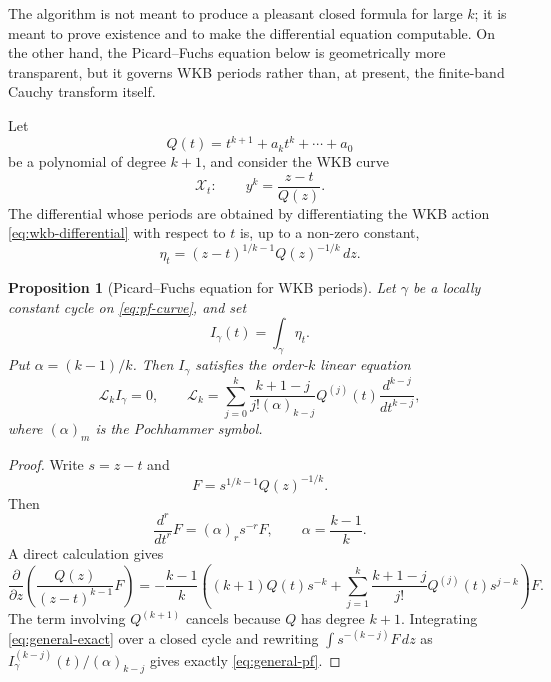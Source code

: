 \documentclass[10pt,twoside,a4paper,reqno]{amsart}
\theoremstyle{plain}
\newtheorem{pro}            {Proposition}
\theoremstyle{definition}
\theoremstyle{remark}
\newenvironment{proposition}{\begin{pro}}{\end{pro}}
\begin{document}
The algorithm is not meant to produce a pleasant closed formula for large $k$; it is meant to prove existence and to make the differential equation computable.  On the other hand, the Picard--Fuchs equation below is geometrically more transparent, but it governs WKB periods rather than, at present, the finite-band Cauchy transform itself.

\medskip
Let
\[
        Q(t)=t^{k+1}+a_kt^k+\cdots+a_0
\]
be a polynomial of degree $k+1$, and consider the WKB curve
\begin{equation}
\label{eq:pf-curve}
        \mathcal X_t:\qquad y^k=\frac{z-t}{Q(z)}.
\end{equation}
The differential whose periods are obtained by differentiating the WKB action
\eqref{eq:wkb-differential} with respect to $t$ is, up to a non-zero constant,
\begin{equation}
\label{eq:eta-general}
        \eta_t=(z-t)^{1/k-1}Q(z)^{-1/k}\,dz .
\end{equation}

\begin{proposition}[Picard--Fuchs equation for WKB periods]
\label{prop:general-pf}
Let $\gamma$ be a locally constant cycle on \eqref{eq:pf-curve}, and set
\[
        I_\gamma(t)=\int_\gamma \eta_t .
\]
Put $\alpha=(k-1)/k$.  Then $I_\gamma$ satisfies the order-$k$ linear equation
\begin{equation}
\label{eq:general-pf}
        \mathcal L_k I_\gamma=0,
        \qquad
        \mathcal L_k=
        \sum_{j=0}^{k}
        \frac{k+1-j}{j!(\alpha)_{k-j}}
        Q^{(j)}(t)\frac{d^{k-j}}{dt^{k-j}},
\end{equation}
where $(\alpha)_m$ is the Pochhammer symbol.
\end{proposition}

\begin{proof}
Write $s=z-t$ and
\[
        F=s^{1/k-1}Q(z)^{-1/k}.
\]
Then
\[
        \frac{d^r}{dt^r}F=(\alpha)_r s^{-r}F,
        \qquad \alpha=\frac{k-1}{k}.
\]
A direct calculation gives
\begin{equation}\label{eq:general-exact}
\frac{\partial}{\partial z}\left(\frac{Q(z)}{(z-t)^{k-1}}F\right)
= -\frac{k-1}{k}
\left(
(k+1)Q(t)s^{-k}+\sum_{j=1}^{k}\frac{k+1-j}{j!}Q^{(j)}(t)s^{j-k}
\right)F .
\end{equation}
The term involving $Q^{(k+1)}$ cancels because $Q$ has degree $k+1$.  Integrating
\eqref{eq:general-exact} over a closed cycle and rewriting
$\int s^{-(k-j)}F\,dz$ as $I_\gamma^{(k-j)}(t)/(\alpha)_{k-j}$ gives exactly
\eqref{eq:general-pf}.
\end{proof}
\end{document}
